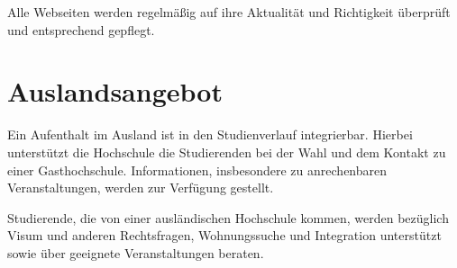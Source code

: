 Alle Webseiten werden regelmäßig auf ihre Aktualität und Richtigkeit überprüft und entsprechend gepflegt.

\section{Auslandsangebot}

Ein Aufenthalt im Ausland ist in den Studienverlauf integrierbar. Hierbei unterstützt die Hochschule die Studierenden bei der Wahl und dem Kontakt zu einer Gasthochschule. Informationen, insbesondere zu anrechenbaren Veranstaltungen, werden zur Verfügung gestellt.

Studierende, die von einer ausländischen Hochschule kommen, werden bezüglich Visum und anderen Rechtsfragen, Wohnungssuche und Integration unterstützt sowie über geeignete Veranstaltungen beraten.
